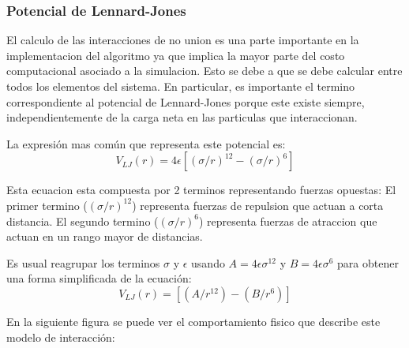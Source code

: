 \documentclass[a4paper,10pt]{report}
\begin{document}
\subsubsection{Potencial de Lennard-Jones}


El calculo de las interacciones de no union es una parte importante en la implementacion del algoritmo ya que implica la mayor parte del costo computacional asociado a la simulacion. 
Esto se debe a que se debe calcular entre todos los elementos del sistema. 
En particular, es importante el termino correspondiente al potencial de Lennard-Jones porque este existe siempre, independientemente de la carga neta en las particulas que interaccionan.

La expresión mas común que representa este potencial es: 
\begingroup
\fontsize{14pt}{5pt}
\begin{equation} V_{LJ}(r)= 4 \epsilon [ (\sigma/r)^{12} - (\sigma/r)^6] \end{equation}
\endgroup

Esta ecuacion esta compuesta por 2 terminos representando fuerzas opuestas:
El primer termino ($(\sigma/r)^{12}$) representa fuerzas de repulsion que actuan a corta distancia.
El segundo termino ($(\sigma/r)^{6}$) representa fuerzas de atraccion que actuan en un rango mayor de distancias.

\vspace{10pt}
Es usual reagrupar los terminos $\sigma$ y  $\epsilon$ usando  
$A=4\epsilon\sigma^{12}  $  y  $B=4\epsilon\sigma^6$ para obtener una forma simplificada de la ecuación:   \begin{equation}  V_{LJ}(r)= [ (A/r^{12}) - (B/r^6)] \end{equation}


\vspace{20pt}


En la siguiente figura se puede ver el comportamiento fisico que describe este modelo de interacción:
\end{document}
